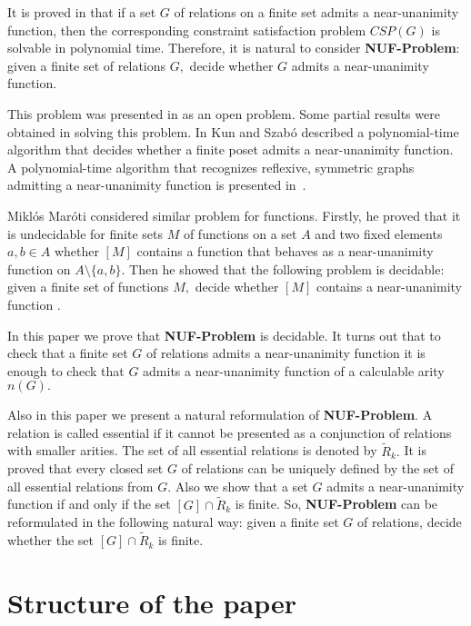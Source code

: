 \documentclass{au}
\theoremstyle{plain}
\theoremstyle{definition}
\theoremstyle{remark}
\numberwithin{equation}{section}
\begin{document}
It is proved in \cite{jeavons} that if a set $G$ of relations on a finite set
admits a near-unanimity function, then the corresponding constraint
satisfaction problem $CSP(G)$ is solvable in polynomial time. Therefore, it is natural
to consider \textbf{NUF-Problem}:
given a finite set of relations $G,$ decide
whether $G$ admits a near-unanimity function.

This problem was presented in \cite{Larose,Maroti2009} as an open problem.
Some partial results were obtained in solving this problem.
In \cite{Kun} Kun and Szab\'o described a polynomial-time algorithm that decides whether a finite poset
admits a near-unanimity function.
A polynomial-time algorithm that
recognizes reflexive, symmetric graphs admitting a near-unanimity function
is presented in~\cite{LaroseLoten}.

Mikl\'os Mar\'oti considered similar problem for functions.
Firstly, he proved that it is undecidable for finite sets $M$ of functions on a set $A$ and
two fixed elements $a, b \in A$
whether $[M]$ contains
a function that behaves as a near-unanimity function on $A\setminus \{a, b\} $\cite{Maroti2007}.
Then he showed that the following problem is decidable:
given a finite set of functions $M,$ decide
whether $[M]$ contains a near-unanimity function \cite{Maroti2009}.

In this paper we prove that \textbf{NUF-Problem} is decidable.
It turns out that to check that a finite set $G$ of relations admits a near-unanimity function
it is enough to check that $G$ admits a near-unanimity function of a calculable arity~$n(G).$

Also in this paper we present a natural reformulation of \textbf{NUF-Problem}.
A relation is called essential if it cannot be presented as a conjunction
of relations with smaller arities.
The set of all essential relations is denoted by $\widetilde R_{k}.$
It is proved that every closed set $G$ of relations
can be uniquely defined by the set of all essential relations from $G.$
Also we show that a set $G$ admits a near-unanimity function if and only if
the set $[G]\cap \widetilde R_{k}$ is finite.
So, \textbf{NUF-Problem} can be reformulated in the following natural way:
given a finite set $G$ of relations, decide whether
the set $[G] \cap \widetilde R_{k}$ is finite. 

\section{Structure of the paper}
\end{document}
